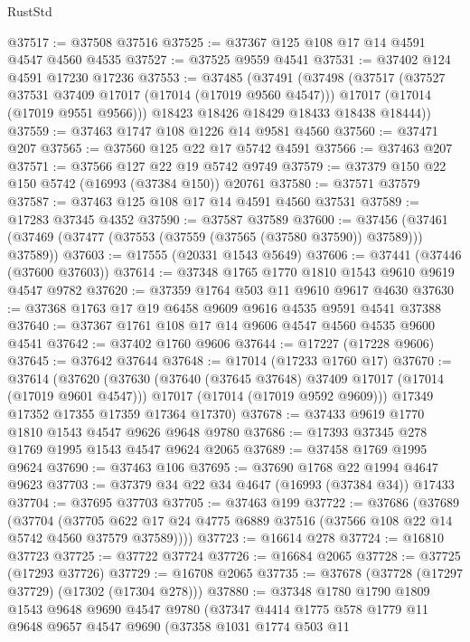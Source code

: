 \begin{lexlean}{RustStd}
\begin{coremodule}
@37517 := @37508 @37516
@37525 := @37367 @125 @108 @17 @14 @4591 @4547 @4560 @4535
@37527 := @37525 @9559 @4541
@37531 := @37402 @124 @4591 @17230 @17236
@37553 := @37485
    (@37491
      (@37498
        (@37517
          (@37527 @37531 @37409 @17017 (@17014 (@17019 @9560 @4547)))
          @17017
          (@17014 (@17019 @9551 @9566)))
        @18423
        @18426
        @18429
        @18433
        @18438
        @18444))
@37559 := @37463 @1747 @108 @1226 @14 @9581 @4560
@37560 := @37471 @207
@37565 := @37560 @125 @22 @17 @5742 @4591
@37566 := @37463 @207
@37571 := @37566 @127 @22 @19 @5742 @9749
@37579 := @37379 @150 @22 @150 @5742 (@16993 (@37384 @150)) @20761
@37580 := @37571 @37579
@37587 := @37463 @125 @108 @17 @14 @4591 @4560 @37531
@37589 := @17283 @37345 @4352
@37590 := @37587 @37589
@37600 := @37456 (@37461 (@37469 (@37477 (@37553 (@37559 (@37565 (@37580 @37590)) @37589))) @37589))
@37603 := @17555 (@20331 @1543 @5649)
@37606 := @37441 (@37446 (@37600 @37603))
@37614 := @37348 @1765 @1770 @1810 @1543 @9610 @9619 @4547 @9782
@37620 := @37359 @1764 @503 @11 @9610 @9617 @4630
@37630 := @37368 @1763 @17 @19 @6458 @9609 @9616 @4535 @9591 @4541 @37388
@37640 := @37367 @1761 @108 @17 @14 @9606 @4547 @4560 @4535 @9600 @4541
@37642 := @37402 @1760 @9606
@37644 := @17227 (@17228 @9606)
@37645 := @37642 @37644
@37648 := @17014 (@17233 @1760 @17)
@37670 := @37614
    (@37620
      (@37630
        (@37640 (@37645 @37648) @37409 @17017 (@17014 (@17019 @9601 @4547)))
        @17017
        (@17014 (@17019 @9592 @9609)))
      @17349
      @17352
      @17355
      @17359
      @17364
      @17370)
@37678 := @37433 @9619 @1770 @1810 @1543 @4547 @9626 @9648 @9780
@37686 := @17393 @37345 @278 @1769 @1995 @1543 @4547 @9624 @2065
@37689 := @37458 @1769 @1995 @9624
@37690 := @37463 @106
@37695 := @37690 @1768 @22 @1994 @4647 @9623
@37703 := @37379 @34 @22 @34 @4647 (@16993 (@37384 @34)) @17433
@37704 := @37695 @37703
@37705 := @37463 @199
@37722 := @37686
    (@37689
      (@37704
        (@37705 @622 @17 @24 @4775 @6889 @37516 (@37566 @108 @22 @14 @5742 @4560 @37579 @37589))))
@37723 := @16614 @278
@37724 := @16810 @37723
@37725 := @37722 @37724
@37726 := @16684 @2065
@37728 := @37725 (@17293 @37726)
@37729 := @16708 @2065
@37735 := @37678 (@37728 (@17297 @37729) (@17302 (@17304 @278)))
@37880 := @37348
    @1780
    @1790
    @1809
    @1543
    @9648
    @9690
    @4547
    @9780
    (@37347
      @4414
      @1775
      @578
      @1779
      @11
      @9648
      @9657
      @4547
      @9690
      (@37358
        @1031
        @1774
        @503
        @11

\end{coremodule}
\end{lexlean}
